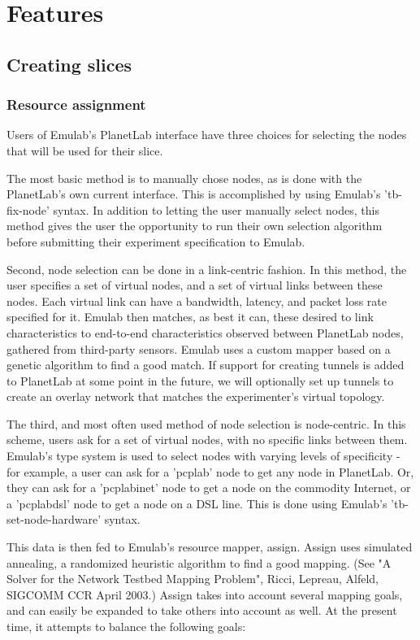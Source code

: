 \section{Features}

\subsection{Creating slices}

\subsubsection{Resource assignment}

Users of Emulab's PlanetLab interface have three choices for selecting the
nodes that will be used for their slice.

The most basic method is to manually chose nodes, as is done with the
PlanetLab's own current interface. This is accomplished by using Emulab's
'tb-fix-node' syntax. In addition to letting the user manually select nodes,
this method gives the user the opportunity to run their own selection algorithm
before submitting their experiment specification to Emulab.

Second, node selection can be done in a link-centric fashion. In this method,
the user specifies a set of virtual nodes, and a set of virtual links between
these nodes. Each virtual link can have a bandwidth, latency, and packet loss
rate specified for it. Emulab then matches, as best it can, these desired to
link characteristics to end-to-end characteristics observed between PlanetLab
nodes, gathered from third-party sensors. Emulab uses a custom mapper based on
a genetic algorithm to find a good match. If support for creating tunnels is
added to PlanetLab at some point in the future, we will optionally set up
tunnels to create an overlay network that matches the experimenter's virtual
topology.

The third, and most often used method of node selection is node-centric. In
this scheme, users ask for a set of virtual nodes, with no specific links
between them. Emulab's type system is used to select nodes with varying levels
of specificity - for example, a user can ask for a 'pcplab' node to get any
node in PlanetLab.  Or, they can ask for a 'pcplabinet' node to get a node on
the commodity Internet, or a 'pcplabdsl' node to get a node on a DSL line.
This is done using Emulab's 'tb-set-node-hardware' syntax.

This data is then fed to Emulab's resource mapper, assign. Assign uses
simulated annealing, a randomized heuristic algorithm to find a good mapping.
(See "A Solver for the Network Testbed Mapping Problem", Ricci, Lepreau,
Alfeld, SIGCOMM CCR April 2003.) Assign takes into account several mapping
goals, and can easily be expanded to take others into account as well.  At the
present time, it attempts to balance the following goals:

